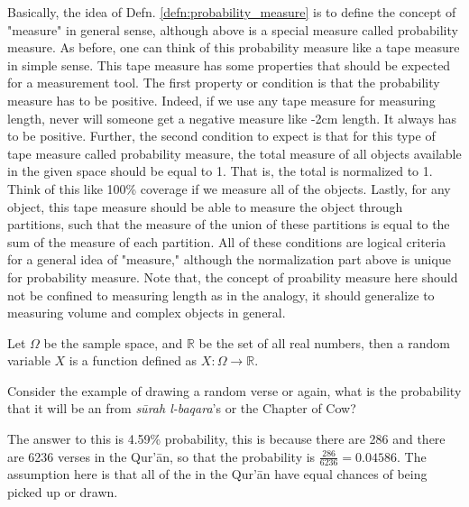Basically, the idea of Defn. \ref{defn:probability_measure} is to define the concept of "measure" in general sense, although above is a special measure called probability measure. As before, one can think of this probability measure like a tape measure in simple sense. This tape measure has some properties that should be expected for a measurement tool. The first property or condition is that the probability measure has to be positive. Indeed, if we use any tape measure for measuring length, never will someone get a negative measure like -2cm length. It always has to be positive. Further, the second condition to expect is that for this type of tape measure called probability measure, the total measure of all objects available in the given space should be equal to 1. That is, the total is normalized to 1. Think of this like 100\% coverage if we measure all of the objects. Lastly, for any object, this tape measure should be able to measure the object through partitions, such that the measure of the union of these partitions is equal to the sum of the measure of each partition. All of these conditions are logical criteria for a general idea of "measure," although the normalization part above is unique for probability measure. Note that, the concept of proability measure here should not be confined to measuring length as in the analogy, it should generalize to measuring volume and complex objects in general.
\begin{defn}
Let $\Omega$ be the sample space, and $\mathbb{R}$ be the set of all real numbers, then a random variable $X$ is a function defined as $X:\Omega\rightarrow\mathbb{R}$.
\end{defn}
\begin{exmp}\label{ex:ayah_prob}
Consider the example of drawing a random verse or   again, what is the probability that it will be an   from \textit{s\=urah l-baqara}'s   or the Chapter of Cow?

The answer to this is 4.59\% probability, this is because there are 286   and there are 6236 verses in the Qur'\=an, so that the probability is $\frac{286}{6236}=0.04586$. The assumption here is that all of the   in the Qur'\=an have equal chances of being picked up or drawn.

\end{exmp}

